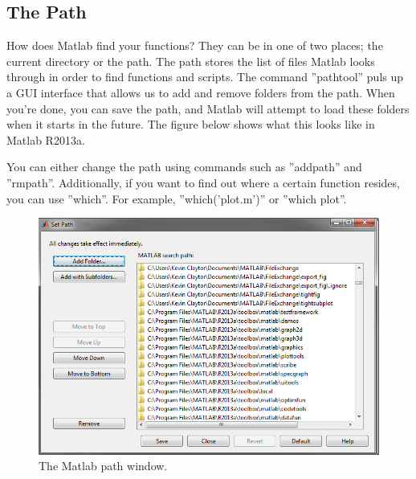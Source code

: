 \begin{quote}

\end{quote}

\pagebreak
\subsection{The Path}
How does Matlab find your functions?
 They can be in one of two places; the current directory or the path.
 The path stores the list of files Matlab looks through in order to find functions and scripts.
 The command ''pathtool'' puls up a GUI interface that allows us to add and remove folders from the path.
 When you're done, you can save the path, and Matlab will attempt to load these folders when it starts in the future.
 The figure below shows what this looks like in Matlab R2013a.

You can either change the path using commands such as ''addpath'' and ''rmpath''.
 Additionally, if you want to find out where a certain function resides, you can use ''which''.
 For example, ''which('plot.m')'' or ''which plot''.

\begin{figure}[ht!]
\centering
\includegraphics[width=120mm]{img/path.png}
\caption{The Matlab path window.}
\label{overflow}
\end{figure}
